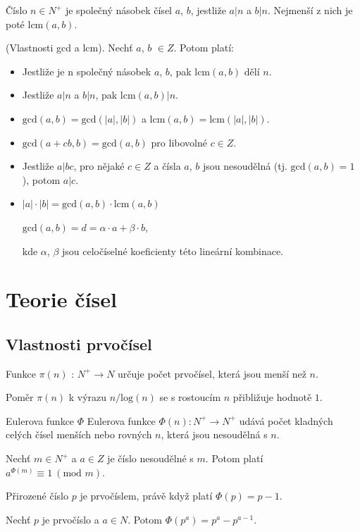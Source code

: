 \documentclass{szzclass}
\begin{document}
Číslo $n \in N^+$ je společný násobek čísel $a$, $b$, jestliže $a|n$ a $b|n$. Nejmenší z nich je poté lcm$(a,b)$.

(Vlastnosti gcd a lcm). Nechť $a$, $b$ $\in Z$. Potom platí:
\begin{itemize}
    \item Jestliže je n společný násobek $a$, $b$, pak $\text{lcm}(a, b)$ dělí $n$.
    \item Jestliže $a|n$ a $b|n$, pak $\text{lcm}(a, b)|n$.
    \item $\text{gcd}(a, b) = \text{gcd}(|a|, |b|)$ a $\text{lcm}(a, b) = \text{lcm}(|a|, |b|)$.
    \item $\text{gcd}(a + cb, b) = \text{gcd}(a, b)$ pro libovolné $c \in Z$.
    \item Jestliže $a|bc$, pro nějaké $c \in Z$ a čísla $a$, $b$ jsou nesoudělná (tj. $\text{gcd}(a, b) = 1$), potom $a|c$.
    \item $|a|\cdot|b| = \text{gcd}(a,b) \cdot \text{lcm}(a,b)$
\begin{center}
$\text{gcd}(a, b) = d = \alpha \cdot a + \beta \cdot b$,
\end{center}
kde $\alpha$, $\beta$ jsou celočíselné koeficienty této lineární kombinace.
\end{itemize}

\newpage

\section{Teorie čísel}

\subsection{Vlastnosti prvočísel}
Funkce $π(n)$ : $N^+ \rightarrow N$ určuje počet prvočísel, která jsou menší než $n$.

Poměr $π(n)$ k výrazu $n/\text{log}(n)$ se s rostoucím $n$ přibližuje hodnotě $1$.

Eulerova funkce $\Phi$ Eulerova funkce $\Phi(n) : N^+ \rightarrow N^+$ udává počet
kladných celých čísel menších nebo rovných $n$, která jsou nesoudělná s $n$.

Nechť $m \in N^+$ a $a \in Z$ je číslo nesoudělné s $m$. Potom platí $a^{\Phi(m)} \equiv 1~(\text{mod }m)$.

Přirozené číslo $p$ je prvočíslem, právě když platí $\Phi(p) = p - 1$.

Nechť $p$ je prvočíslo a $a \in N$. Potom $\Phi(p^a) = p^a - p^{a-1}$.
\end{document}
